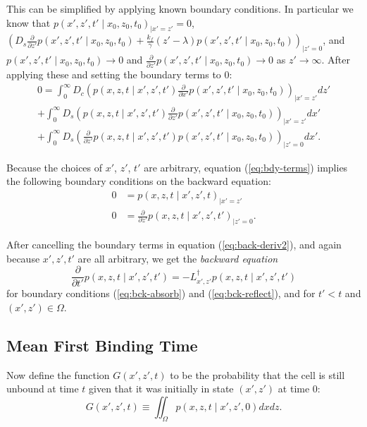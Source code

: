\documentclass{article}
\newcommand{\stiff}{\frac{k_f}{\gamma}}
\newcommand{\dd}{d}
\newcommand{\Pder}[2]{\frac{\partial #1}{\partial #2}}
\newcommand{\Integral}[4]{\int_{#3}^{#4} {#1} \dd #2}
\begin{document}
This can be simplified by applying known boundary conditions. In
particular we know that
$p(x', z', t' \mid x_0, z_0, t_0)_{|x' = z'} = 0$,
$\left(D_s \Pder{}{z'} p(x', z', t' \mid x_0, z_0, t_0) + \stiff (z' -
  \lambda) p(x', z', t' \mid x_0, z_0, t_0)\right)_{|z' = 0}$, and
$p(x', z', t' \mid x_0, z_0, t_0) \rightarrow 0$ and
$\Pder{}{z'}p(x', z', t' \mid x_0, z_0, t_0) \rightarrow 0$ as
$z' \rightarrow \infty$. After applying these and setting the boundary
terms to 0:
\begin{multline}
  \label{eq:bdy-terms}
  0 = \Integral{D_c \left(p(x, z, t \mid x', z', t') \Pder{}{x'}p(x',
      z', t' \mid x_0, z_0, t_0)\right)_{|x' = z'}}{z'}{0}{\infty} \\
  + \Integral{D_s \left( p(x, z, t \mid x', z', t') \Pder{}{z'}p(x',
        z', t' \mid x_0, z_0, t_0)\right)_{|x'=z'}}{x'}{0}{\infty} \\
  + \Integral{D_s \left(\Pder{}{z'}p(x, z, t \mid x', z', t') p(x', z',
        t' \mid x_0, z_0, t_0)\right)_{|z'=0}}{x'}{0}{\infty}.
\end{multline}

Because the choices of $x'$, $z'$, $t'$ are arbitrary, equation
(\ref{eq:bdy-terms}) implies the following boundary conditions on the
backward equation:
\begin{align}
  \label{eq:bck-absorb}
  0 &= p(x, z, t \mid x', z', t)_{|x' = z'} \\
  \label{eq:bck-reflect}
  0 &= \Pder{}{z'} p(x, z, t \mid x', z', t')_{|z' = 0}.
\end{align}

After cancelling the boundary terms in equation
(\ref{eq:back-deriv2}), and again because $x', z', t'$ are all
arbitrary, we get the \emph{backward equation}
\begin{equation}
  \Pder{}{t'} p(x, z, t \mid x', z', t') = -L^\dag_{x', z'} p(x, z, t \mid x',
  z', t')
  \label{eq:backward}
\end{equation}
for boundary conditions (\ref{eq:bck-absorb}) and
(\ref{eq:bck-reflect}), and for $t' < t$ and $(x', z') \in \Omega$.

\subsection{Mean First Binding Time}
\label{sec:mean-first-binding}

Now define the function $G(x', z', t)$ to be the probability that the
cell is still unbound at time $t$ given that it was initially in state
$(x', z')$ at time $0$:
\begin{equation}
  G(x', z', t) \equiv \iint_\Omega p(x, z, t \mid x', z', 0) dx dz.
  \label{eq:G-defn}
\end{equation}
\end{document}
